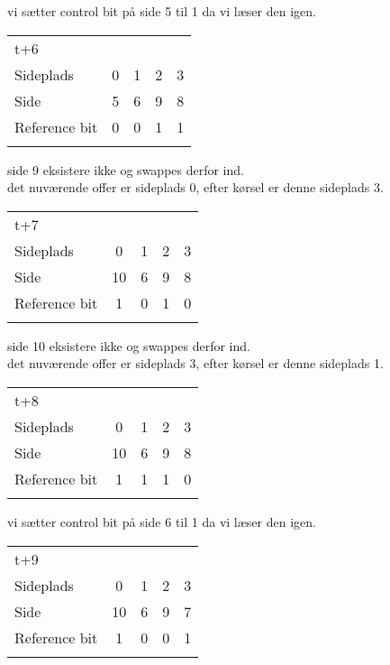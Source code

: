 \documentclass[titlepage]{article}
\begin{document}
vi sætter control bit på side 5 til 1 da vi læser den igen.\\

\begin{tabular}{l | c | c | c | c}
t+6\\
Sideplads    & 0 & 1 & 2 & 3\\
Side         & 5 & 6 & 9 & 8\\
Reference bit & 0 & 0 & 1 & 1\\\\
\end{tabular}

side 9 eksistere ikke og swappes derfor ind.\\
det nuværende offer er sideplads 0, efter kørsel er denne sideplads 3.\\

\begin{tabular}{l | c | c | c | c}
t+7\\
Sideplads    & 0 & 1 & 2 & 3\\
Side         & 10 & 6 & 9 & 8\\
Reference bit & 1 & 0 & 1 & 0\\\\
\end{tabular}

side 10 eksistere ikke og swappes derfor ind.\\
det nuværende offer er sideplads 3, efter kørsel er denne sideplads 1.\\

\begin{tabular}{l | c | c | c | c}
t+8\\
Sideplads    & 0 & 1 & 2 & 3\\
Side         & 10 & 6 & 9 & 8\\
Reference bit & 1 & 1 & 1 & 0\\\\
\end{tabular}

vi sætter control bit på side 6 til 1 da vi læser den igen.\\


\begin{tabular}{l | c | c | c | c}
t+9\\
Sideplads    & 0 & 1 & 2 & 3\\
Side         & 10 & 6 & 9 & 7\\
Reference bit & 1 & 0 & 0 & 1\\\\
\end{tabular}
\end{document}
